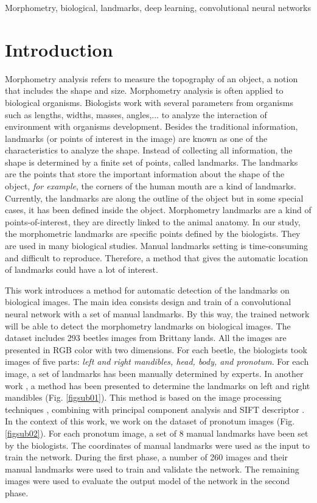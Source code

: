 \documentclass[conference]{IEEEtran}
\begin{document}
\begin{IEEEkeywords}
Morphometry, biological, landmarks, deep learning, convolutional neural networks
\end{IEEEkeywords}

\section{Introduction}
Morphometry analysis refers to measure the topography of an object, a notion that includes the shape and size. Morphometry analysis is often applied to biological organisms. Biologists work with several parameters from organisms such as lengths, widths, masses, angles,... to analyze the interaction of environment with organisms development. Besides the traditional information, landmarks (or points of interest in the image) are known as one of the characteristics to analyze the shape. Instead of collecting all information, the shape is determined by a finite set of points, called landmarks. The landmarks are the points that store the important information about the shape of the object, \textit{for example}, the corners of the human mouth are a kind of landmarks. Currently, the landmarks are along the outline of the object but in some special cases, it has been defined inside the object. Morphometry landmarks are a kind of points-of-interest, they are directly linked to the animal anatomy. In our study, the morphometric landmarks are specific points defined by the biologists. They are used in many biological studies. Manual landmarks setting is time-consuming and difficult to reproduce. Therefore, a method that gives the automatic location of landmarks could have a lot of interest.

This work introduces a method for automatic detection of the landmarks on biological images. The main idea consists design and train of  a convolutional neural network \cite{lecun2010convolutional} with a set of manual landmarks. By this way, the trained network will be able to detect the morphometry landmarks on biological images. The dataset includes 293 beetles images from Brittany lands. All the images are presented in RGB color with two dimensions. For each beetle, the biologists took images of five parts: \textit{left and right mandibles, head, body, and pronotum}. For each image, a set of landmarks has been manually determined by experts. In another work \cite{le2017maelab}, a method has been presented to determine the landmarks on left and right mandibles (Fig. \ref{figsub01}). This method is based on the image processing techniques \cite{canny1986computational}, combining with principal component analysis \cite{shlens2014tutorial} and SIFT descriptor \cite{lowe2004distinctive}. In the context of this work, we work on the dataset of pronotum images (Fig. \ref{figsub02}). For each pronotum image, a set of 8 manual landmarks have been set by the biologists. The coordinates of manual landmarks were used as the input to train the network. During the first phase, a number of 260 images and their manual landmarks were used to train and validate the network. The remaining images were used to evaluate the output model of the network in the second phase.
\end{document}
